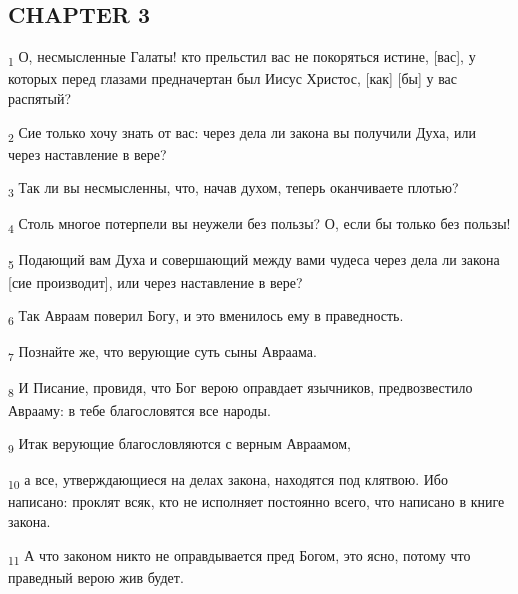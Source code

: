 \subsection{CHAPTER 3}
\begin{tcolorbox}
\textsubscript{1} О, несмысленные Галаты! кто прельстил вас не покоряться истине, [вас], у которых перед глазами предначертан был Иисус Христос, [как] [бы] у вас распятый?
\end{tcolorbox}
\begin{tcolorbox}
\textsubscript{2} Сие только хочу знать от вас: через дела ли закона вы получили Духа, или через наставление в вере?
\end{tcolorbox}
\begin{tcolorbox}
\textsubscript{3} Так ли вы несмысленны, что, начав духом, теперь оканчиваете плотью?
\end{tcolorbox}
\begin{tcolorbox}
\textsubscript{4} Столь многое потерпели вы неужели без пользы? О, если бы только без пользы!
\end{tcolorbox}
\begin{tcolorbox}
\textsubscript{5} Подающий вам Духа и совершающий между вами чудеса через дела ли закона [сие производит], или через наставление в вере?
\end{tcolorbox}
\begin{tcolorbox}
\textsubscript{6} Так Авраам поверил Богу, и это вменилось ему в праведность.
\end{tcolorbox}
\begin{tcolorbox}
\textsubscript{7} Познайте же, что верующие суть сыны Авраама.
\end{tcolorbox}
\begin{tcolorbox}
\textsubscript{8} И Писание, провидя, что Бог верою оправдает язычников, предвозвестило Аврааму: в тебе благословятся все народы.
\end{tcolorbox}
\begin{tcolorbox}
\textsubscript{9} Итак верующие благословляются с верным Авраамом,
\end{tcolorbox}
\begin{tcolorbox}
\textsubscript{10} а все, утверждающиеся на делах закона, находятся под клятвою. Ибо написано: проклят всяк, кто не исполняет постоянно всего, что написано в книге закона.
\end{tcolorbox}
\begin{tcolorbox}
\textsubscript{11} А что законом никто не оправдывается пред Богом, это ясно, потому что праведный верою жив будет.
\end{tcolorbox}
